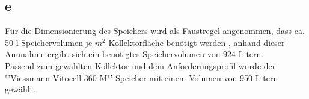 \subsection{e}
Für die Dimensionierung des Speichers wird als Faustregel angenommen, dass ca. 50 l Speichervolumen je 
$m^2$ Kollektorfläche benötigt werden \cite[S.122]{Sick22}, anhand dieser Annnahme ergibt sich ein benötigtes 
Speichervolumen von 924 Litern.\\
Passend zum gewählten Kollektor und dem Anforderungsprofil wurde der "'Viessmann Vitocell 360-M"'-Speicher mit einem Volumen von 950 Litern gewählt.\\
